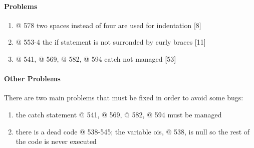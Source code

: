 \paragraph{Problems}
\begin{enumerate}
	\item @ 578 two spaces instead of four are used for indentation [8]
	\item @ 553-4 the if statement is not surronded by curly braces [11]
	\item @ 541, @ 569, @ 582, @ 594 catch not managed [53]
\end{enumerate} 

\paragraph{Other Problems}

There are two main problems that must be fixed in order to avoid some bugs:

\begin{enumerate}
	\item the catch statement @ 541, @ 569, @ 582, @ 594 must be managed
	\item there is a dead code @ 538-545; the variable ois, @ 538, is null so the rest of the code is never executed
\end{enumerate} 
